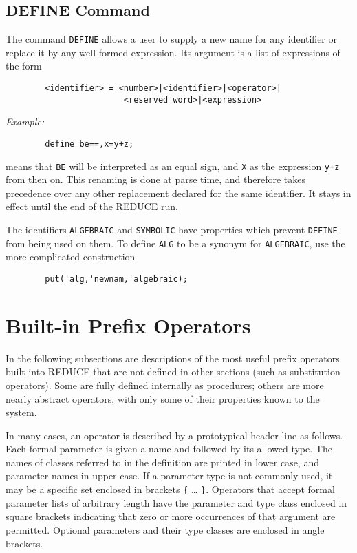 \documentclass[11pt,letterpaper]{book}
\makeatletter
\newcommand{\REDUCE}{REDUCE}
\newcommand{\underscore}{\_}
\newcommand{\ttindex}[1]{{\renewcommand{\_}{\protect\underscore}%
                          \index{#1@{\tt #1}}}}
\makeatother
\begin{document}
\section{DEFINE Command}

The command {\tt DEFINE}\ttindex{DEFINE} allows a user to supply a new name for
any identifier or replace it by any well-formed expression.  Its argument
is a list of expressions of the form
{\small\begin{verbatim}
        <identifier> = <number>|<identifier>|<operator>|
                        <reserved word>|<expression>
\end{verbatim}}

{\it Example:}
{\small\begin{verbatim}
        define be==,x=y+z;
\end{verbatim}}
means that {\tt BE} will be interpreted as an equal sign, and {\tt X}
as the expression {\tt y+z} from then on.  This renaming is done at parse
time, and therefore takes precedence over any other replacement declared
for the same identifier.  It stays in effect until the end of the
{\REDUCE} run.

The identifiers {\tt ALGEBRAIC} and {\tt SYMBOLIC} have properties which
prevent {\tt DEFINE}\ttindex{DEFINE} from being used on them.  To define
{\tt ALG} to be a synonym for {\tt ALGEBRAIC}, use the more complicated
construction
{\small\begin{verbatim}
        put('alg,'newnam,'algebraic);
\end{verbatim}}
\chapter{Built-in Prefix Operators}
In the following subsections are descriptions of the most useful prefix
operators built into {\REDUCE} that are not defined in other sections (such
as substitution operators). Some are fully defined internally as
procedures; others are more nearly abstract operators, with only some of
their properties known to the system.

In many cases, an operator is described by a prototypical header line as
follows. Each formal parameter is given a name and followed by its allowed
type. The names of classes referred to in the definition are printed in
lower case, and parameter names in upper case. If a parameter type is not
commonly used, it may be a specific set enclosed in brackets {\tt \{} \ldots
{\tt \}}.
Operators that accept formal parameter lists of arbitrary length have the
parameter and type class enclosed in square brackets indicating that zero
or more occurrences of that argument are permitted. Optional parameters
and their type classes are enclosed in angle brackets.
\end{document}
